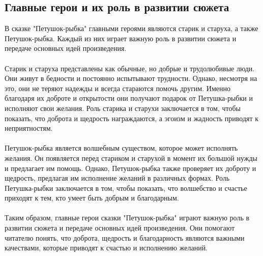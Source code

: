 \documentclass{article}
\begin{document}
\subsection{Главные герои и их роль в развитии сюжета}
В сказке "{}{}Петушок-рыбка"{}{} главными героями являются старик и старуха, а также Петушок-рыбка. Каждый из них играет важную роль в развитии сюжета и передаче основных идей произведения.\\
~\\
Старик и старуха представлены как обычные, но добрые и трудолюбивые люди. Они живут в бедности и постоянно испытывают трудности. Однако, несмотря на это, они не теряют надежды и всегда стараются помочь другим. Именно благодаря их доброте и открытости они получают подарок от Петушка-рыбки и исполняют свои желания. Роль старика и старухи заключается в том, чтобы показать, что доброта и щедрость награждаются, а эгоизм и жадность приводят к неприятностям.\\
~\\
Петушок-рыбка является волшебным существом, которое может исполнять желания. Он появляется перед стариком и старухой в момент их большой нужды и предлагает им помощь. Однако, Петушок-рыбка также проверяет их доброту и щедрость, предлагая им исполнение желаний в различных формах. Роль Петушка-рыбки заключается в том, чтобы показать, что волшебство и счастье приходят к тем, кто умеет быть добрым и благодарным.\\
~\\
Таким образом, главные герои сказки "{}{}Петушок-рыбка"{}{} играют важную роль в развитии сюжета и передаче основных идей произведения. Они помогают читателю понять, что доброта, щедрость и благодарность являются важными качествами, которые приводят к счастью и исполнению желаний.\\
~\\

\newpage
\end{document}
